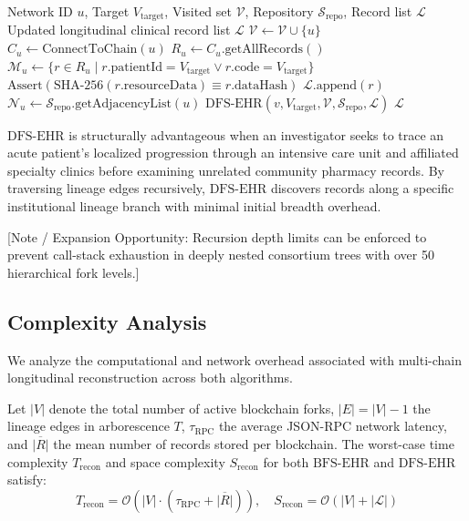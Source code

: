 \begin{algorithm}[t]
\caption{Depth-First Longitudinal Search ($\text{DFS-EHR}$)}
\label{alg:dfs}
\begin{algorithmic}[1]
\REQUIRE Network ID $u$, Target $V_{\text{target}}$, Visited set $\mathcal{V}$, Repository $\mathcal{S}_{\text{repo}}$, Record list $\mathcal{L}$
\ENSURE Updated longitudinal clinical record list $\mathcal{L}$
\STATE $\mathcal{V} \leftarrow \mathcal{V} \cup \{u\}$
\STATE $C_u \leftarrow \text{ConnectToChain}(u)$
\STATE $R_u \leftarrow C_u.\text{getAllRecords}()$
\STATE $\mathcal{M}_u \leftarrow \{r \in R_u \mid r.\text{patientId} = V_{\text{target}} \lor r.\text{code} = V_{\text{target}}\}$
    \STATE $\text{Assert}(\text{SHA-256}(r.\text{resourceData}) \equiv r.\text{dataHash})$
    \STATE $\mathcal{L}.\text{append}(r)$
\ENDFOR
\STATE $\mathcal{N}_u \leftarrow \mathcal{S}_{\text{repo}}.\text{getAdjacencyList}(u)$
        \STATE $\text{DFS-EHR}(v, V_{\text{target}}, \mathcal{V}, \mathcal{S}_{\text{repo}}, \mathcal{L})$
    \ENDIF
\ENDFOR
\RETURN $\mathcal{L}$
\end{algorithmic}
\end{algorithm}

$\text{DFS-EHR}$ is structurally advantageous when an investigator seeks to trace an acute patient's localized progression through an intensive care unit and affiliated specialty clinics before examining unrelated community pharmacy records. By traversing lineage edges recursively, $\text{DFS-EHR}$ discovers records along a specific institutional lineage branch with minimal initial breadth overhead.

[Note / Expansion Opportunity: Recursion depth limits can be enforced to prevent call-stack exhaustion in deeply nested consortium trees with over 50 hierarchical fork levels.]

\subsection{Complexity Analysis}
We analyze the computational and network overhead associated with multi-chain longitudinal reconstruction across both algorithms.

\begin{theorem}
\label{thm:complexity_traversal}
Let $|V|$ denote the total number of active blockchain forks, $|E| = |V| - 1$ the lineage edges in arborescence $T$, $\tau_{\text{RPC}}$ the average JSON-RPC network latency, and $\overline{|R|}$ the mean number of records stored per blockchain. The worst-case time complexity $T_{\text{recon}}$ and space complexity $S_{\text{recon}}$ for both $\text{BFS-EHR}$ and $\text{DFS-EHR}$ satisfy:
\begin{equation}
T_{\text{recon}} = \mathcal{O}\left(|V| \cdot (\tau_{\text{RPC}} + \overline{|R|})\right), \quad S_{\text{recon}} = \mathcal{O}\left(|V| + |\mathcal{L}|\right)
\end{equation}
\end{theorem}


